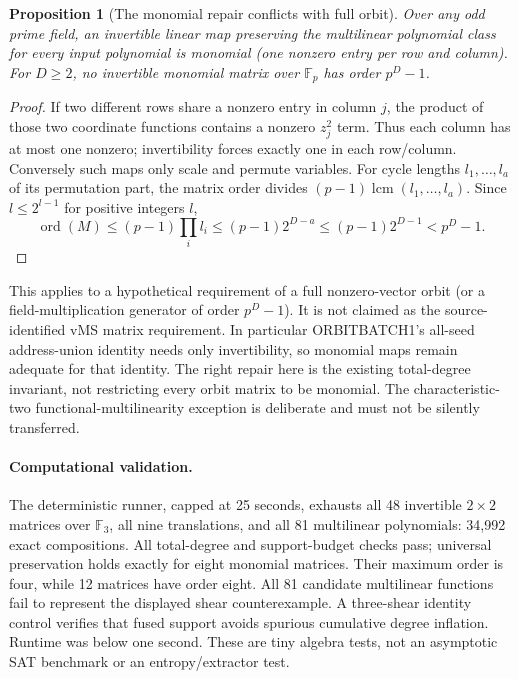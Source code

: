 \documentclass[11pt]{article}
\newtheorem{proposition}{Proposition}
\begin{document}
\begin{proposition}[The monomial repair conflicts with full orbit]
Over any odd prime field, an invertible linear map preserving the
multilinear polynomial class for every input polynomial is monomial
(one nonzero entry per row and column). For $D\ge2$, no invertible
monomial matrix over $\mathbb F_p$ has order $p^D-1$.
\end{proposition}
\begin{proof}
If two different rows share a nonzero entry in column $j$, the product
of those two coordinate functions contains a nonzero $z_j^2$ term.
Thus each column has at most one nonzero; invertibility forces exactly
one in each row/column. Conversely such maps only scale and permute
variables. For cycle lengths $l_1,\ldots,l_a$ of its permutation part,
the matrix order divides $(p-1)\operatorname{lcm}(l_1,\ldots,l_a)$.
Since $l\le2^{l-1}$ for positive integers $l$,
\[
 \operatorname{ord}(M)\le(p-1)\prod_i l_i
 \le(p-1)2^{D-a}\le(p-1)2^{D-1}<p^D-1.
\]
\end{proof}
This applies to a hypothetical requirement of a full nonzero-vector orbit
(or a field-multiplication generator of order $p^D-1$). It is not claimed
as the source-identified vMS matrix requirement. In particular ORBITBATCH1's
all-seed address-union identity needs only invertibility, so monomial maps
remain adequate for that identity. The right repair here is
the existing total-degree invariant, not restricting every orbit matrix
to be monomial. The characteristic-two functional-multilinearity
exception is deliberate and must not be silently transferred.

\paragraph{Computational validation.}
The deterministic runner, capped at 25 seconds, exhausts all 48
invertible $2\times2$ matrices over $\mathbb F_3$, all nine translations,
and all 81 multilinear polynomials: 34,992 exact compositions. All
total-degree and support-budget checks pass; universal preservation holds
exactly for eight monomial matrices. Their maximum order is four, while
12 matrices have order eight. All 81 candidate multilinear functions fail
to represent the displayed shear counterexample. A three-shear identity
control verifies that fused support avoids spurious cumulative degree
inflation. Runtime was below one second. These are tiny algebra tests,
not an asymptotic SAT benchmark or an entropy/extractor test.
\end{document}
